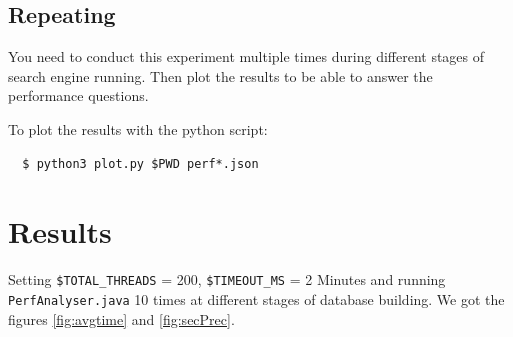 \documentclass[12pt]{IEEEtran}
\begin{document}




\subsection{Repeating}
You need to conduct this experiment multiple times during different stages of search engine running. Then plot the results to be able to answer the performance questions.

To plot the results with the python script:
\begin{lstlisting}
  $ python3 plot.py $PWD perf*.json
\end{lstlisting}

\section{Results}
Setting \small\texttt{\$TOTAL\_THREADS} = 200, \small\texttt{\$TIMEOUT\_MS} = 2 Minutes and running \small\texttt{PerfAnalyser.java} 10 times at different stages of database building.
We got the figures \ref{fig:avgtime} and \ref{fig:secPrec}. %
\end{document}
